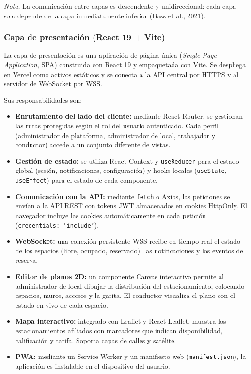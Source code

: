 \textit{Nota.} La comunicación entre capas es descendente y unidireccional: cada capa solo depende de la capa inmediatamente inferior (Bass et al., 2021).

\newpage\subsubsection{Capa de presentación (React 19 + Vite)}

La capa de presentación es una aplicación de página única (\textit{Single Page Application}, SPA) construida con React 19 y empaquetada con Vite. Se despliega en Vercel como activos estáticos y se conecta a la API central por HTTPS y al servidor de WebSocket por WSS.

Sus responsabilidades son:

\begin{itemize}
    \item \textbf{Enrutamiento del lado del cliente:} mediante React Router, se gestionan las rutas protegidas según el rol del usuario autenticado. Cada perfil (administrador de plataforma, administrador de local, trabajador y conductor) accede a un conjunto diferente de vistas.
    \item \textbf{Gestión de estado:} se utiliza React Context y \texttt{useReducer} para el estado global (sesión, notificaciones, configuración) y hooks locales (\texttt{useState}, \texttt{useEffect}) para el estado de cada componente.
    \item \textbf{Comunicación con la API:} mediante \texttt{fetch} o Axios, las peticiones se envían a la API REST con tokens JWT almacenados en cookies HttpOnly. El navegador incluye las cookies automáticamente en cada petición (\texttt{credentials: 'include'}).
    \item \textbf{WebSocket:} una conexión persistente WSS recibe en tiempo real el estado de los espacios (libre, ocupado, reservado), las notificaciones y los eventos de reserva.
    \item \textbf{Editor de planos 2D:} un componente Canvas interactivo permite al administrador de local dibujar la distribución del estacionamiento, colocando espacios, muros, accesos y la garita. El conductor visualiza el plano con el estado en vivo de cada espacio.
    \item \textbf{Mapa interactivo:} integrado con Leaflet y React-Leaflet, muestra los estacionamientos afiliados con marcadores que indican disponibilidad, calificación y tarifa. Soporta capas de calles y satélite.
    \item \textbf{PWA:} mediante un Service Worker y un manifiesto web (\texttt{manifest.json}), la aplicación es instalable en el dispositivo del usuario.
\end{itemize}

